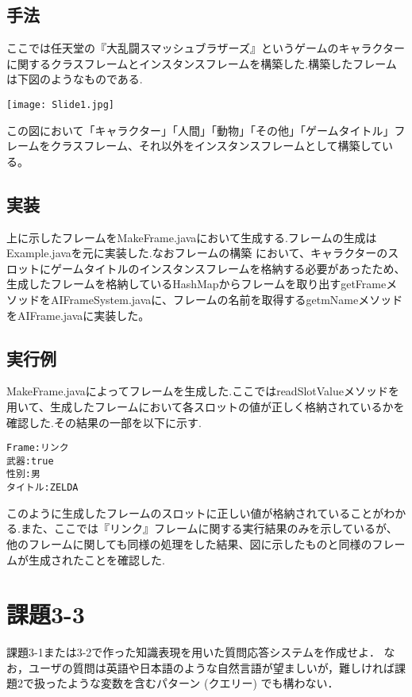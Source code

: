 \documentclass[a4j]{jarticle}
\begin{document}
\subsection{手法}
ここでは任天堂の『大乱闘スマッシュブラザーズ』というゲームのキャラクターに関するクラスフレームとインスタンスフレームを構築した.構築したフレームは下図のようなものである.


\texttt{[image: Slide1.jpg]}

この図において「キャラクター」「人間」「動物」「その他」「ゲームタイトル」フレームをクラスフレーム、それ以外をインスタンスフレームとして構築している。


\subsection{実装}
上に示したフレームをMakeFrame.javaにおいて生成する.フレームの生成はExample.javaを元に実装した.なおフレームの構築
において、キャラクターのスロットにゲームタイトルのインスタンスフレームを格納する必要があったため、生成したフレームを格納しているHashMapからフレームを取り出すgetFrameメソッドをAIFrameSystem.javaに、フレームの名前を取得するgetmNameメソッドをAIFrame.javaに実装した。
\subsection{実行例}
MakeFrame.javaによってフレームを生成した.ここではreadSlotValueメソッドを用いて、生成したフレームにおいて各スロットの値が正しく格納されているかを確認した.その結果の一部を以下に示す.
\\

\begin{screen}
\begin{verbatim}
Frame:リンク
武器:true
性別:男
タイトル:ZELDA
\end{verbatim}
\end{screen}

このように生成したフレームのスロットに正しい値が格納されていることがわかる.また、ここでは『リンク』フレームに関する実行結果のみを示しているが、他のフレームに関しても同様の処理をした結果、図に示したものと同様のフレームが生成されたことを確認した.


\section{課題3-3}
\begin{screen}
課題3-1または3-2で作った知識表現を用いた質問応答システムを作成せよ．
なお，ユーザの質問は英語や日本語のような自然言語が望ましいが，難しければ課題2で扱ったような変数を含むパターン (クエリー) でも構わない．
\end{screen}
\end{document}
